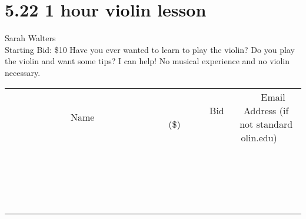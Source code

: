 \documentclass[11pt]{article}
\begin{document}
\section*{5.22 1 hour violin lesson}
Sarah Walters
\\
Starting Bid: \$10
\newline
Have you ever wanted to learn to play the violin? Do you play the violin and want some tips? I can help! No musical experience and no violin necessary.
\\[3ex]
\begin{tabular}{c c c}
~~~~~~~~~~~~~Name~~~~~~~~~~~~~ & ~~~~~~~~~Bid (\$)~~~~~~~~~  & ~~~Email Address (if not standard olin.edu)~~~\\
 & & \\
\hline
 & & \\
\hline
 & & \\
\hline
 & & \\
\hline
 & & \\
\hline
 & & \\
\hline
 & & \\
\hline
 & & \\
\hline
 & & \\
\hline
 & & \\
\hline
 & & \\
\hline
 & & \\
\hline
 & & \\
\hline
 & & \\
\hline
 & & \\
\hline
 & & \\
\hline
 & & \\
\hline
 & & \\
\hline
 & & \\
\hline
\end{tabular}
\newpage
\end{document}
